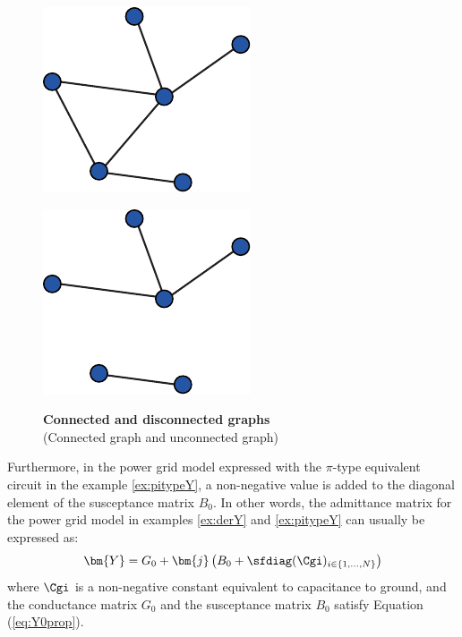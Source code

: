 \documentclass[graybox, envcountchap]{svmult}
\begin{document}
\begin{figure}[t]
  \centering
  {
  \begin{minipage}{0.42\linewidth}
    \centering
    \includegraphics[width = .6\linewidth]{figs/congraph}
    \medskip
    \label{fig:congraph} 
  \end{minipage}
  \begin{minipage}{0.42\linewidth}
    \centering
    \includegraphics[width = .6\linewidth]{figs/notcongraph}
    \medskip
    \label{fig:notcongraph} 
  \end{minipage}
  }
\medskip
\caption{\textbf{Connected and disconnected graphs}
\\
\centering(Connected graph and unconnected graph)}
\label{fig:congraphab} 
\medskip
\end{figure}

Furthermore, in the power grid model expressed with the $\pi$-type equivalent circuit in the example \ref{ex:pitypeY}, a non-negative value is added to the diagonal element of the susceptance matrix $B_0$.
In other words, the admittance matrix for the power grid model in examples \ref{ex:derY} and \ref{ex:pitypeY} can usually be expressed as:
\begin{align}\label{eq:Ypig}
\bm{Y} = G_0 + \bm{j} \left( B_0 + \sfdiag( \Cgi )_{i \in \{1,\ldots,N\}} \right)
\end{align}
where $ \Cgi $ is a non-negative constant equivalent to capacitance to ground, and the conductance matrix $G_0$ and the susceptance matrix $B_0$ satisfy Equation (\ref{eq:Y0prop}).
\end{document}

